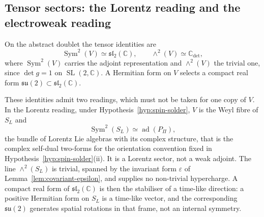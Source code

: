 \documentclass[11pt,a4paper]{article}
\theoremstyle{definition}
\theoremstyle{remark}
\newcommand{\SL}{\operatorname{SL}}
\begin{document}
  \subsection{Tensor sectors: the Lorentz reading and the electroweak reading}
    \label{ssec:electroweak-tensors}

    On the abstract doublet the tensor identities are
    \begin{equation}
      \label{eq:sym2-fibre}
      \operatorname{Sym}^2(V) \simeq \mathfrak{sl}_2(\mathbb{C}),
      \qquad
      \wedge^2(V) \simeq \mathbb{C}_{\det} ,
    \end{equation}
    where $\operatorname{Sym}^2(V)$ carries the adjoint representation and $\wedge^2(V)$ the trivial one,
    since $\det g = 1$ on $\SL(2,\mathbb{C})$.
    A Hermitian form on $V$ selects a compact real form $\mathfrak{su}(2) \subset \mathfrak{sl}_2(\mathbb{C})$.

    These identities admit two readings, which must not be taken for one copy of $V$.
    In the Lorentz reading, under Hypothesis~\ref{hyp:spin-solder}, $V$ is the Weyl fibre of $S_L$ and
    \begin{equation}
      \label{eq:sym2-adjoint}
      \operatorname{Sym}^2(S_L) \simeq \operatorname{ad}(P_\Pi) ,
    \end{equation}
    the bundle of Lorentz Lie algebras with its complex structure, that is the complex self-dual two-forms
    for the orientation convention fixed in Hypothesis~\ref{hyp:spin-solder}(ii).
    It is a Lorentz sector, not a weak adjoint.
    The line $\wedge^2(S_L)$ is trivial, spanned by the invariant form $\varepsilon$ of
    Lemma~\ref{lem:covariant-epsilon}, and supplies no non-trivial hypercharge.
    A compact real form of $\mathfrak{sl}_2(\mathbb{C})$ is then the stabiliser of a time-like direction: a
    positive Hermitian form on $S_L$ is a time-like vector, and the corresponding $\mathfrak{su}(2)$
    generates spatial rotations in that frame, not an internal symmetry.
\end{document}
